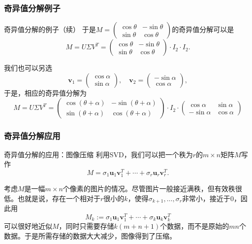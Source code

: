 \begin{frame}
\frametitle{奇异值分解例子}

\begin{block}{奇异值分解的例子（续）}
于是$M = \begin{pmatrix} \cos\theta & -\sin\theta \\ \sin\theta & \cos\theta \end{pmatrix}$的奇异值分解可以是
$$M = U\Sigma V^T = \begin{pmatrix} \cos\theta & -\sin\theta \\ \sin\theta & \cos\theta \end{pmatrix} \cdot I_2 \cdot I_2.$$

\vspace{1em}
\pause

我们也可以另选
$$\mathbf{v}_1 = \begin{pmatrix} \cos\alpha \\ \sin\alpha \end{pmatrix}, \quad \mathbf{v}_2 = \begin{pmatrix} -\sin\alpha \\ \cos\alpha \end{pmatrix},$$
于是，相应的奇异值分解为
$$M = U\Sigma V^T = \begin{pmatrix} \cos(\theta+\alpha) & -\sin(\theta+\alpha) \\ \sin(\theta+\alpha) & \cos(\theta+\alpha) \end{pmatrix} \cdot I_2 \cdot \begin{pmatrix} \cos\alpha & \sin\alpha \\ -\sin\alpha & \cos\alpha \end{pmatrix}$$
\end{block}

\end{frame}


\begin{frame}
\frametitle{奇异值分解应用}

\begin{block}{奇异值分解的应用：图像压缩}
利用SVD，我们可以把一个秩为$r$的$m\times n$矩阵$M$写作
$$M = \sigma_1\mathbf{u}_1\mathbf{v}_1^T + \cdots + \sigma_r\mathbf{u}_r\mathbf{v}_r^T.$$

考虑$M$是一幅$m\times n$个像素的图片的情况。尽管图片一般接近满秩，但{\color{red}有效秩}很低。也就是说，存在一个相对于$r$很小的$k$，使得$\sigma_{k+1},\ldots,\sigma_{r}$非常小，接近于$0$，因此用
$$M_k := \sigma_1\mathbf{u}_1\mathbf{v}_1^T + \cdots + \sigma_k\mathbf{u}_k\mathbf{v}_k^T$$
可以很好地近似$M$，同时只需要存储$k(m+n+1)$个数据，而不是原始的$mn$个数据。于是所需存储的数据大大减少，图像得到了压缩。
\end{block}

\end{frame}

